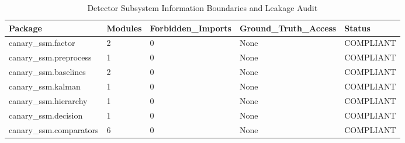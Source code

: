 \begin{table}[htbp]
\centering
\caption{Detector Subsystem Information Boundaries and Leakage Audit}
\label{tab:table_T2_code_integrity}
\begin{tabular}{lllll}
\hline
Package & Modules & Forbidden\_Imports & Ground\_Truth\_Access & Status \\
\hline
canary\_ssm.factor & 2 & 0 & None & COMPLIANT \\
canary\_ssm.preprocess & 1 & 0 & None & COMPLIANT \\
canary\_ssm.baselines & 2 & 0 & None & COMPLIANT \\
canary\_ssm.kalman & 1 & 0 & None & COMPLIANT \\
canary\_ssm.hierarchy & 1 & 0 & None & COMPLIANT \\
canary\_ssm.decision & 1 & 0 & None & COMPLIANT \\
canary\_ssm.comparators & 6 & 0 & None & COMPLIANT \\
\hline
\end{tabular}
\end{table}
